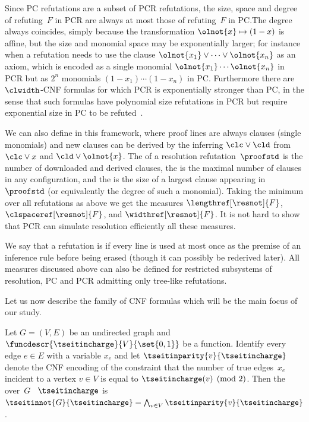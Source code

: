 Since PC refutations are a subset of PCR refutations, the size, space
and degree of refuting~$F$ in PCR are always at most those of
refuting~$F$ in PC.\@ The degree always coincides, simply because the
%
%
transformation $\olnot{x} \mapsto (1-x)$ is affine, 
but the size and
monomial space may be exponentially larger; for instance when
a refutation needs to use the clause
$\olnot{x_1}\lor\cdots\lor\olnot{x_n}$ as an axiom, which is encoded
as a single monomial $\olnot{x_1}\cdots\olnot{x_n}$ in PCR but as
$2^n$ monomials $(1-x_1)\cdots(1-x_n)$ in PC.
%
Furthermore there are $\clwidth$-CNF formulas for which PCR is
exponentially stronger than PC, in the sense that such formulas have
polynomial size refutations in PCR but require exponential size in PC to be
%
refuted~\cite{dRLNS21Negative}.

We can also define  in this framework, 
where proof lines are always clauses (\ieComma single monomials)
and new clauses can be derived by the 
inferring
$\clc \lor \cld$
from
$\clc \lor x$
and
$\cld \lor \olnot{x}$.
The  of a resolution refutation~$\proofstd$ is the number
of downloaded and derived clauses, the  is the
maximal number of clauses in any configuration, and the  
 is the size of a largest clause appearing
in~$\proofstd$ (or equivalently the degree of such a monomial). 
Taking the minimum over all refutations as above we
get the measures
$\lengthref[\resnot]{F}$,
$\clspaceref[\resnot]{F}$,
and
$\widthref[\resnot]{F}$.
It is not hard to show that PCR can simulate resolution efficiently
\wrt all these measures.

We say that a refutation is  if every line is
used at most once as  the premise of an inference rule before being
erased (though it can possibly be rederived later). All 
measures
discussed above can also be defined for restricted subsystems of
resolution, PC and PCR admitting only tree-like refutations.

Let us now
describe
%
the family of CNF formulas 
which will be the main focus
of our study.

\begin{definition}
  \label{def:tseitinmod2}
  Let $G = (V,E)$ be an undirected graph and 
  $\funcdescr{\tseitincharge}{V}{\set{0,1}}$ 
  be a function. 
  Identify every edge $e \in E$ with a variable $x_e$
  and  let
  $\tseitinparity{v}{\tseitincharge}$
  denote the CNF encoding
%
  of the constraint
  that the number of true edges~$x_e$ incident to a vertex $v \in V$
  is equal to $\tseitincharge(v) \pmod{2}$.
%
%
%
  Then the  over~$G$ \wrt{}~$\tseitincharge$
  is $\tseitinnot{G}{\tseitincharge}=\bigwedge_{v\in V}\tseitinparity{v}{\tseitincharge}$.
\end{definition}


